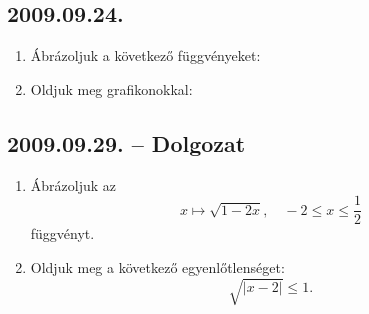 \subsection*{2009.09.24.}
\begin{enumerate}
\item Ábrázoljuk a következő függvényeket:
\item Oldjuk meg grafikonokkal:
\end{enumerate}

\subsection*{2009.09.29. -- Dolgozat}
\begin{enumerate}
\item Ábrázoljuk az
$$ x\mapsto \sqrt{1-2x},\quad -2\le x \le \frac{1}{2}$$
függvényt.
\item Oldjuk meg a következő egyenlőtlenséget:
$$\sqrt{|x-2|}\le 1.$$
\end{enumerate}


